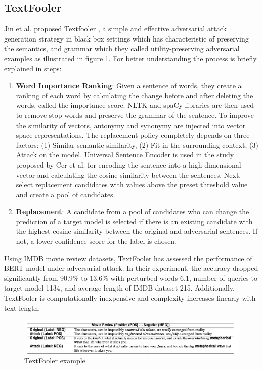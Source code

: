 \documentclass[%
	BCOR=8mm, %
	DIV=12,
	toc=bibliography, %
	toc=listof, %
	oneside, %
	egregdoesnotlikesansseriftitles, %
	]{scrbook}
\begin{document}
\subsection{TextFooler}
\label{subsection:textfooler}
Jin et al. proposed Textfooler \cite{jia_certified_2019}, a simple and effective adversarial attack generation strategy in black box settings which has characteristic of preserving the semantics, and grammar which they called utility-preserving adversarial examples as illustrated in figure \ref{diag:TextFoolerExp}. For better understanding the process is briefly explained in steps:
\begin{enumerate}
    \item  \textbf{Word Importance Ranking}: Given a sentence of words, they create a ranking of each word by calculating the change before and after deleting the words, called the importance score. NLTK and spaCy libraries are then used to remove stop words and preserve the grammar of the sentence. To improve the similarity of vectors, antonymy and synonymy are injected into vector space representations.
    The replacement policy completely depends on three factors: (1) Similar semantic similarity, (2) Fit in the surrounding context, (3) Attack on the model. Universal Sentence Encoder is used in the study proposed by Cer et al.\cite{cer_universal_2018} for encoding the sentence into a high-dimensional vector and calculating the cosine similarity between the sentences. Next, select replacement candidates with values above the preset threshold value and create a pool of candidates.
    \item \textbf{Replacement}: A candidate from a pool of candidates who can change the prediction of a target model is selected if there is an existing candidate with the highest cosine similarity between the original and adversarial sentences. If not, a lower confidence score for the label is chosen.
\end{enumerate}
Using IMDB movie review datasets, TextFooler has assessed the performance of BERT model under adversarial attack. In their experiment, the accuracy dropped significantly from 90.9\% to 13.6\% with perturbed words 6.1, number of queries to target model 1134, and average length of IMDB dataset 215. Additionally, TextFooler is computationally inexpensive and complexity increases linearly with text length. 
\begin{figure}[H]
    \centering
    \includegraphics[width=1.0\textwidth]{img/textfooler_example.png}
    \caption[Example of TextFooler]{TextFooler example  \cite{jia_certified_2019} }
    \label{diag:TextFoolerExp}
\end{figure}
\end{document}
